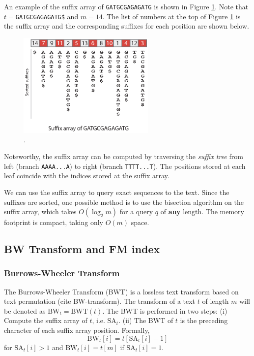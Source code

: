 An example of the suffix array of \texttt{GATGCGAGAGATG} is shown
in Figure \ref{fig:chap2:suffix_array}. Note that
$t=$\texttt{GATGCGAGAGATG\$} and $m=14$. The list of numbers at the
top of Figure \ref{fig:chap2:suffix_array} is the suffix array and the
corresponding suffixes for each position are shown below.

\begin{figure}[h]
	\begin{minipage}[b]{\linewidth}
	  \centering
	  \includegraphics*[width=0.6\textwidth]{figures/chap2_suffix_array}
	  \caption{.}
	  \label{fig:chap2:suffix_array}
   \end{minipage}
\end{figure}

Noteworthy, the suffix array can be computed by traversing the {\em
  suffix tree} from left (branch \texttt{AAAA...A}) to right (branch \texttt{TTTT...T}). The positions stored at each leaf
coincide with the indices stored at the suffix array.

We can use the suffix array to query exact sequences to the
text. Since the suffixes are sorted, one possible method is to use the
bisection algorithm on the suffix array, which takes $O(\log_2 m)$ for
a query $q$ of {\bf any} length. The memory footprint is compact, taking
only $O(m)$ space.

\subsection{BW Transform and FM index}
\label{sec:chap2:seed-bwt}
\subsubsection{Burrows-Wheeler Transform}

The Burrows-Wheeler Transform (BWT) is a lossless text transform based
on text permutation (cite BW-transform). The transform of a text $t$ of
length $m$ will be denoted as $\mbox{BW}_t=\mbox{BWT}(t)$. The BWT is performed in
two steps: (i) Compute the suffix array of $t$,
i.e. $\mbox{SA}_t$. (ii) The BWT of $t$ is the preceding character of
each suffix array position. Formally, 
\begin{equation}
  \mbox{BW}_t[i] = t[\mbox{SA}_t[i]-1]
\end{equation}
for $\mbox{SA}_t[i] > 1$ and $\mbox{BW}_t[i] = t[m]$ if
$\mbox{SA}_t[i] = 1$.

